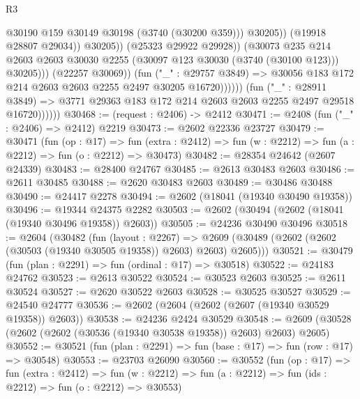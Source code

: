 \begin{lexlean}{R3}
\begin{coremodule}
                                            @30190
                                            @159
                                            @30149
                                            @30198
                                            (@3740 (@30200 @359)))
                                          @30205))
                                      (@19918 @28807 @29034))
                                    @30205))
                                (@25323 @29922 @29928))
                              (@30073
                                @235
                                @214
                                @2603
                                @2603
                                @30030
                                @2255
                                (@30097 @123 @30030 (@3740 (@30100 @123)))
                                @30205)))
                          (@22257 @30069))
                        (fun ("_" : @29757 @3849) =>
                        @30056 @183 @172 @214 @2603 @2603 @2255 @2497 @30205 @16720))))))
              (fun ("_" : @28911 @3849) =>
              @3771 @29363 @183 @172 @214 @2603 @2603 @2255 @2497 @29518 @16720))))))
@30468 := (request : @2406) -> @2412
@30471 := @2408 (fun ("_" : @2406) => @2412) @2219
@30473 := @2602 @22336 @23727
@30479 := @30471
    (fun (op : @17) =>
    fun (extra : @2412) => fun (w : @2212) => fun (a : @2212) => fun (o : @2212) => @30473)
@30482 := @28354 @24642 (@2607 @24339)
@30483 := @28400 @24767
@30485 := @2613 @30483 @2603
@30486 := @2611 @30485
@30488 := @2620 @30483 @2603
@30489 := @30486 @30488
@30490 := @24417 @2278
@30494 := @2602 (@18041 (@19340 @30490 @19358))
@30496 := @19344 @24375 @2282
@30503 := @2602 (@30494 (@2602 (@18041 (@19340 @30496 @19358)) @2603))
@30505 := @24236 @30490 @30496
@30518 := @2604
    (@30482
      (fun (layout : @2267) =>
      @2609 (@30489 (@2602 (@2602 (@30503 (@19340 @30505 @19358)) @2603) @2603) @2605)))
@30521 := @30479 (fun (plan : @2291) => fun (ordinal : @17) => @30518)
@30522 := @24183 @24762
@30523 := @2613 @30522
@30524 := @30523 @2603
@30525 := @2611 @30524
@30527 := @2620 @30522 @2603
@30528 := @30525 @30527
@30529 := @24540 @24777
@30536 := @2602 (@2604 (@2602 (@2607 (@19340 @30529 @19358)) @2603))
@30538 := @24236 @2424 @30529
@30548 := @2609 (@30528 (@2602 (@2602 (@30536 (@19340 @30538 @19358)) @2603) @2603) @2605)
@30552 := @30521 (fun (plan : @2291) => fun (base : @17) => fun (row : @17) => @30548)
@30553 := @23703 @26090
@30560 := @30552
    (fun (op : @17) =>
    fun (extra : @2412) =>
    fun (w : @2212) => fun (a : @2212) => fun (ids : @2212) => fun (o : @2212) => @30553)

\end{coremodule}
\end{lexlean}
